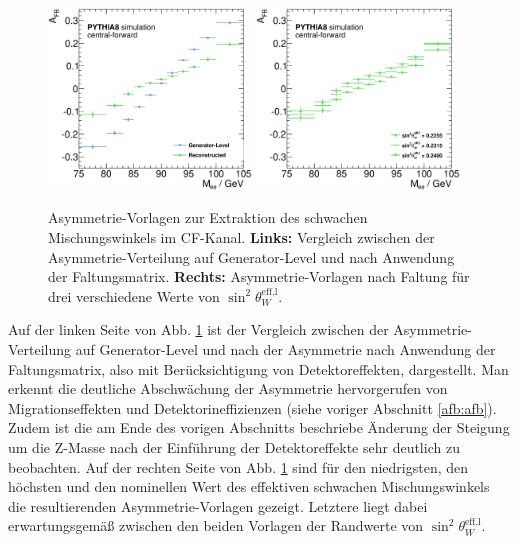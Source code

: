 \begin{figure}
    \centering
    \includegraphics[width=0.48\textwidth]{plots/templates_cf_comp}
    \hfill
    \includegraphics[width=0.48\textwidth]{plots/templates_cf}
    \caption[Asymmetrie-Vorlagen zur Extraktion des schwachen Mischungswinkels]
        {Asymmetrie-Vorlagen zur Extraktion des schwachen Mischungswinkels im
        \ac{CF}-Kanal. \textbf{Links:} Vergleich zwischen der
        Asymmetrie-Verteilung auf Generator-Level und nach Anwendung der
        Faltungsmatrix. \textbf{Rechts:} Asymmetrie-Vorlagen nach Faltung für
        drei verschiedene Werte von $\sin^2\theta_W^\text{eff,l}$.}
    \label{fig:vorlage}
\end{figure}

Auf der linken Seite von Abb. \ref{fig:vorlage} ist der Vergleich zwischen der
Asymmetrie-Verteilung auf Generator-Level und nach der Asymmetrie nach
Anwendung der Faltungsmatrix, also mit Berücksichtigung von Detektoreffekten,
dargestellt. Man erkennt die deutliche Abschwächung der Asymmetrie
hervorgerufen von Migrationseffekten und Detektorineffizienzen (siehe voriger
Abschnitt \ref{afb:afb}). Zudem ist die am Ende des vorigen Abschnitts
beschriebe Änderung der Steigung um die Z-Masse nach der Einführung der
Detektoreffekte sehr deutlich zu beobachten. Auf der rechten Seite von Abb.
\ref{fig:vorlage} sind für den niedrigsten, den höchsten und den nominellen
Wert des effektiven schwachen Mischungswinkels die resultierenden
Asymmetrie-Vorlagen gezeigt. Letztere liegt dabei erwartungsgemäß zwischen den
beiden Vorlagen der Randwerte von $\sin^2\theta_W^\text{eff,l}$.

